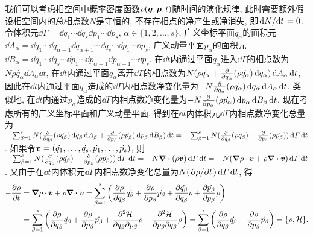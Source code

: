 我们可以考虑相空间中概率密度函数$ \rho(\vb*{q},\vb*{p},t) $随时间的演化规律, 此时需要额外假设相空间内的总相点数$ N $是守恒的, 不存在相点的净产生或净消失, 即$ \dv*{N}{t}=0 $. 令体积元$ \dd{\varGamma} = \dd{q_1} \cdots \dd{q_s} \dd{p_1} \cdots \dd{p_s} $, $ \alpha \in \{1,2,\ldots,s\} $, 广义坐标平面$ q_{\alpha} $的面积元$ \dd{A_{\alpha}} = \dd{q_1} \cdots \dd{q_{\alpha-1}} \dd{q_{\alpha+1}} \cdots \dd{q_s} \cdots \dd{p_1} \cdots \dd{p_s} $, 广义动量平面$ p_{\alpha} $的面积元$ \dd{B_{\alpha}} = \dd{q_1} \cdots \dd{q_s} \cdots \dd{p_1} \cdots \dd{p_{\alpha-1}} \dd{p_{\alpha+1}} \cdots \dd{p_s} $. 在$ \dd{t} $内通过平面$ q_{\alpha} $进入$ \dd{\varGamma} $的相点数为$ N \rho \dot{q_{\alpha}} \dd{A_{\alpha}} \dd{t} $, 在$ \dd{t} $内通过平面$ q_{\alpha} $离开$ \dd{\varGamma} $的相点数为$ N (\rho \dot{q_{\alpha}} + \pdv{q_{\alpha}} (\rho \dot{q_{\alpha}}) \dd{q_{\alpha}}) \dd{A_{\alpha}} \dd{t} $, 因此在$ \dd{t} $内通过平面$ q_{\alpha} $造成的$ \dd{\varGamma} $内相点数净变化量为$ - N \pdv{q_{\alpha}} (\rho \dot{q_{\alpha}}) \dd{q_{\alpha}} \dd{A_{\alpha}} \dd{t} $. 类似地, 在$ \dd{t} $内通过$ p_{\alpha} $造成的$ \dd{\varGamma} $内相点数净变化量为$ - N \pdv{p_{\alpha}} (\rho \dot{p_{\alpha}}) \dd{p_{\alpha}} \dd{B_{\beta}} \dd{t} $. 现在考虑所有的广义坐标平面和广义动量平面, 得到在$ \dd{t} $内体积元$ \dd{\varGamma} $内相点数净变化总量为$ - \sum_{\beta=1}^s N (\pdv{q_{\beta}} (\rho \dot{q_{\beta}}) \dd{q_{\beta}} \dd{A_{\beta}} + \pdv{p_{\beta}} (\rho \dot{p_{\beta}}) \dd{p_{\beta}} \dd{B_{\beta}}) \dd{t} = -\sum_{\beta=1}^s N (\pdv{q_{\beta}} (\rho \dot{q_{\beta}}) + \pdv{p_{\beta}} (\rho \dot{p_{\beta}}) ) \dd{\varGamma}\dd{t} $. 如果令$ \vb*{v}=(\dot{q_1},\ldots,\dot{q_s},\dot{p_1},\ldots,\dot{p_s}) $, 则$ -\sum_{\beta=1}^s N (\pdv{q_{\beta}} (\rho \dot{q_{\beta}}) + \pdv{p_{\beta}} (\rho \dot{p_{\beta}}) ) \dd{\varGamma}\dd{t} = -N \div{(\rho \vb*{v})} \dd{\varGamma}\dd{t} = -N (\grad{\rho} \cdot \vb*{v} + \rho \div{\vb*{v}}) \dd{\varGamma}\dd{t} $. 又由于在$ \dd{t} $内体积元$ \dd{\varGamma} $内相点数净变化总量为$ N (\pdv*{\rho}{t}) \dd{\varGamma}\dd{t} $, 得
\begin{align*}
    -\pdv{\rho}{t} &= \grad{\rho} \cdot \vb*{v} + \rho \div{\vb*{v}} = \sum_{\beta=1}^s \bigg(\pdv{\rho}{q_{\beta}} \dot{q_{\beta}} + \pdv{\rho}{p_{\beta}} \dot{p_{\beta}} + \pdv{\dot{q_{\beta}}}{q_{\beta}} \rho + \pdv{\dot{p_{\beta}}}{p_{\beta}} \rho \bigg)\\
    &= \sum_{\beta=1}^s \bigg(\pdv{\rho}{q_{\beta}} \dot{q_{\beta}} + \pdv{\rho}{p_{\beta}} \dot{p_{\beta}} + \pdv{\hami}{q_{\beta}}{p_{\beta}} \rho - \pdv{\hami}{p_{\beta}}{q_{\beta}} \rho \bigg) = \sum_{\beta=1}^s \bigg(\pdv{\rho}{q_{\beta}} \dot{q_{\beta}} + \pdv{\rho}{p_{\beta}} \dot{p_{\beta}} \bigg) = \pb{\rho}{\hami}.
\end{align*}
